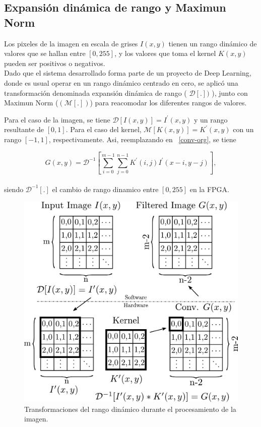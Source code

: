 \documentclass[a4paper]{article}
\begin{document}
\subsection{Expansión dinámica de rango y Maximun Norm}\label{dynamicrange}
Los pixeles de la imagen en escala de grises $I(x,y)$ tienen un rango dinámico de valores que se hallan entre $[0,255]$,
y los valores que toma el kernel $K(x,y)$ pueden ser positivos o negativos.\\
Dado que el sistema desarrollado forma parte de un proyecto de Deep Learning, donde es usual operar en un rango dinámico centrado en cero, se aplicó una transformación denominada  expansión dinámica de rango ( $\mathcal{D}[.])$ ),
junto con Maximun Norm ($(\mathcal{M}[.])$) para reacomodar los diferentes rangos de valores.

Para el caso de la imagen, se tiene $\mathcal{D}[I(x,y)]=I^\prime(x,y)$ y un rango resultante de $[0,1]$.
Para el caso del kernel, $\mathcal{M}[K(x,y)]=K^\prime(x,y)$ con un rango $[-1,1]$, respectivamente.
Asi, reemplazando en ~\eqref{conv-org}, se tiene 

\begin{equation}\label{conv-org1}
  G(x,y) = \mathcal{D}^{-1}\left[\sum_{i=0}^{m-1} \sum_{j=0}^{n-1}K^\prime(i,j)I^\prime(x-i,y-j)\right],
\end{equation}\\
siendo $\mathcal{D}^{-1}[.]$ el cambio de rango dinamico entre $[0,255]$ en la FPGA.

\begin{figure}[H]
\centering
\includegraphics[scale=0.47]{wflow3}
\caption{Transformaciones del rango dinámico durante el procesamiento de la imagen.}
\label{transformation}
\end{figure}
\end{document}
